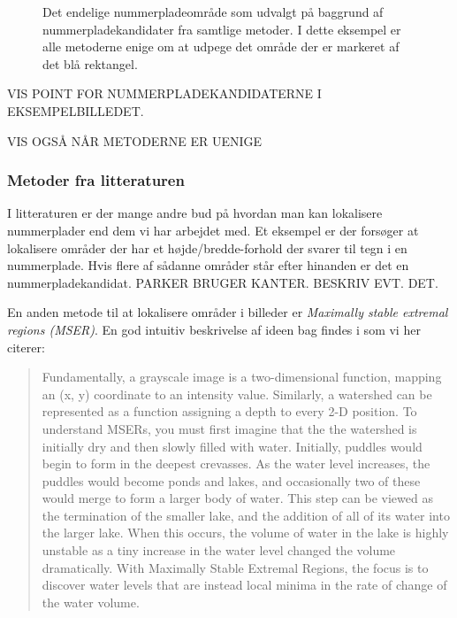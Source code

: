 \begin{figure}[htp]
  \centering
  \caption{Det endelige nummerpladeområde som udvalgt på baggrund af nummerpladekandidater fra samtlige metoder. I dette eksempel er alle metoderne enige om at udpege det område der er markeret af det blå rektangel.}
  \label{fig:DetectMain-result}  
\end{figure}

VIS POINT FOR NUMMERPLADEKANDIDATERNE I EKSEMPELBILLEDET.

VIS OGSÅ NÅR METODERNE ER UENIGE
\subsubsection{Metoder fra litteraturen}
I litteraturen er der mange andre bud på hvordan man kan lokalisere nummerplader end dem vi har arbejdet med. Et eksempel er \cite{parker} der forsøger at lokalisere områder der har et højde/bredde-forhold der svarer til tegn i en nummerplade. Hvis flere af sådanne områder står efter hinanden er det en nummerpladekandidat. PARKER BRUGER KANTER. BESKRIV EVT. DET.

En anden metode til at lokalisere områder i billeder er \textit{Maximally stable extremal regions (MSER)}. En god intuitiv beskrivelse af ideen bag findes i \cite{murphy} som vi her citerer:
\begin{quote}
Fundamentally, a grayscale image is a two-dimensional function, mapping an (x, y) coordinate to an intensity value. Similarly, a watershed can be represented as a function assigning a depth to every 2-D position. To understand MSERs, you must first imagine that the the watershed is initially dry and then slowly filled with water. Initially, puddles would begin to form in the deepest crevasses. As the water level increases, the puddles would become ponds and lakes, and occasionally two of these would merge to form a larger body of water. This step can be viewed as the termination of the smaller lake, and the addition of all of its water into the larger lake. When this occurs, the volume of water in the lake is highly unstable as a tiny increase in the water level changed the volume dramatically. With Maximally Stable Extremal Regions, the focus is to discover water levels that are instead local minima in the rate of change of the water volume.
\end{quote}


